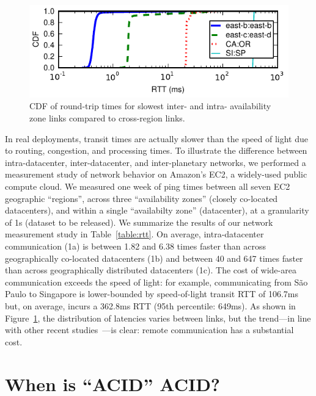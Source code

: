 \begin{figure}
\includegraphics[width=\columnwidth]{graphs/ping-plot.pdf}
\caption{CDF of round-trip times for slowest inter- and intra-
  availability zone links compared to cross-region links.}
\label{fig:rtt}
\end{figure}

In real deployments, transit times are actually slower than the speed
of light due to routing, congestion, and processing times. To
illustrate the difference between intra-datacenter, inter-datacenter,
and inter-planetary networks, we performed a measurement study of
network behavior on Amazon's EC2, a widely-used public compute
cloud. We measured one week of ping times between all seven EC2
geographic ``regions'', across three ``availability zones'' (closely
co-located datacenters), and within a single ``availabilty zone''
(datacenter), at a granularity of 1s (dataset to be released). We
summarize the results of our network measurement study in
Table~\ref{table:rtt}. On average, intra-datacenter communication (1a)
is between 1.82 and 6.38 times faster than across geographically
co-located datacenters (1b) and between 40 and 647 times faster than
across geographically distributed datacenters (1c). The cost of
wide-area communication exceeds the speed of light: for example,
communicating from S\~{a}o Paulo to Singapore is lower-bounded by
speed-of-light transit RTT of 106.7ms but, on average, incurs a
362.8ms RTT (95th percentile: 649ms). As shown in
Figure~\ref{fig:rtt}, the distribution of latencies varies between
links, but the trend---in line with other recent studies~\cite{mdcc,
  redblue}---is clear: remote communication has a substantial cost.

\section{When is ``ACID'' ACID?}
\label{sec:modernacid}

